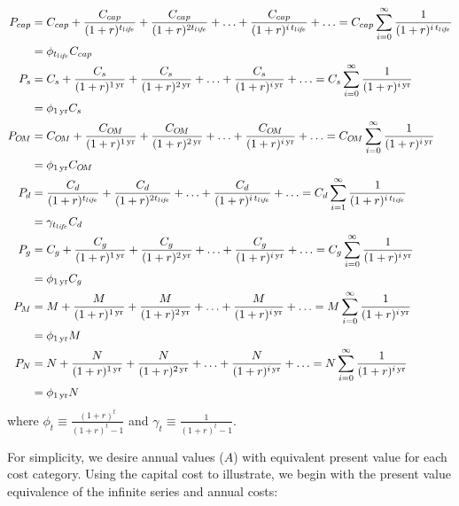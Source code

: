 \begin{align} \label{eq:present_values}
\footnotesize{}
  P_{cap} &= C_{cap} + \frac{C_{cap}}{(1 + r)^{\tlife}} + \frac{C_{cap}}{(1 + r)^{2 \tlife}} +
             \ldots + \frac{C_{cap}}{(1 + r)^{\itlife}} + \ldots 
           = C_{cap} \sum_{i = 0}^{\infty} \frac{1}{(1 + r)^{\itlife}} \nonumber \\
          &= \phi_{\tlife} C_{cap} \\
%
  P_s &= C_s + \frac{C_s}{(1 + r)^{\oneyr}} + \frac{C_s}{(1 + r)^{\twoyr}} + 
         \ldots + \frac{C_s}{(1 + r)^{\iyr}} + \ldots 
       = C_s \sum_{i = 0}^{\infty} \frac{1}{(1 + r)^{\iyr}} \nonumber \\
      &= \phi_{\oneyr} C_s \\
%
  P_{\om} &= C_{\om} + \frac{C_{\om}}{(1 + r)^{\oneyr}} + \frac{C_{\om}}{(1 + r)^{\twoyr}} + 
             \ldots + \frac{C_{\om}}{(1 + r)^{\iyr}} + \ldots 
           = C_{\om} \sum_{i = 0}^{\infty} \frac{1}{(1 + r)^{\iyr}} \nonumber \\
          &= \phi_{\oneyr} C_{\om} \\
%
  P_d &= \frac{C_d}{(1 + r)^{\tlife}} + \frac{C_d}{(1 + r)^{2 \tlife}} + 
         \ldots + \frac{C_d}{(1 + r)^{\itlife}} + \ldots 
       = C_d \sum_{i = 1}^{\infty} \frac{1}{(1 + r)^{\itlife}} \nonumber \\
      &= \gamma_{\tlife} C_d \\
%
  P_g &= C_g + \frac{C_g}{(1 + r)^{\oneyr}} + \frac{C_g}{(1 + r)^{\twoyr}} + 
         \ldots + \frac{C_g}{(1 + r)^{\iyr}} + \ldots 
       = C_g \sum_{i = 0}^{\infty} \frac{1}{(1 + r)^{\iyr}} \nonumber \\
      &= \phi_{\oneyr} C_g \\
%
  P_M &= M + \frac{M}{(1 + r)^{\oneyr}} + \frac{M}{(1 + r)^{\twoyr}} + 
         \ldots + \frac{M}{(1 + r)^{\iyr}} + \ldots
       = M \sum_{i = 0}^{\infty} \frac{1}{(1 + r)^{\iyr}} \nonumber \\
      &= \phi_{\oneyr} M \\
%
  P_N &= N + \frac{N}{(1 + r)^{\oneyr}} + \frac{N}{(1 + r)^{\twoyr}} + 
         \ldots + \frac{N}{(1 + r)^{\iyr}} + \ldots
       = N \sum_{i = 0}^{\infty} \frac{1}{(1 + r)^{\iyr}} \nonumber \\
      &= \phi_{\oneyr} N
\end{align}
%
where $\phi_t \equiv \frac{(1 + r)^t}{(1 + r)^t - 1}$
and $\gamma_t \equiv \frac{1}{(1 + r)^t - 1}$.

For simplicity, we desire annual values ($A$)
with equivalent present value for each cost category. 
Using the capital cost to illustrate, 
we begin with the present value equivalence of the infinite series and 
annual costs:

